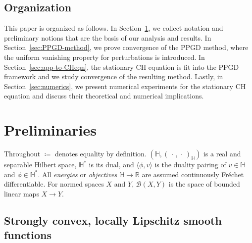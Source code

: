 \documentclass{amsart}
\newcommand{\calB}{{\mathcal{B}}}
\newcommand{\LL}{\mathcal{L}}
\newcommand{\pairing}[2]{\bigl\langle #1 , #2 \bigr\rangle}
\newcommand{\HH}{\mathbb{H}}
\newcommand{\RR}{\mathbb{R}}
\theoremstyle{definition}
\begin{document}
	\subsection{Organization}
This paper is organized as follows. In Section~\ref{sec:prelim}, we collect notation and preliminary notions that are the basis of our analysis and results. In Section~\ref{sec:PPGD-method}, we prove convergence of the PPGD method, where the uniform vanishing property for perturbations is introduced. In Section~\ref{sec:app-to-CHeqn}, the stationary CH equation is fit into the PPGD framework and we study convergence of the resulting method. Lastly, in Section~\ref{sec:numerics}, we present numerical experiments for the stationary CH equation and discuss their theoretical and numerical implications. 



	\section{Preliminaries}
	\label{sec:prelim}

Throughout $\coloneqq$ denotes equality by definition. $(\HH, (\, \cdot\, ,\, \cdot\, )_\HH)$ is a real and separable Hilbert space, $\HH^*$ is its dual, and $\pairing{\phi}{v}$ is the duality pairing of $v\in\HH$ and $\phi\in\HH^*$.  All \emph{energies} or \emph{objectives} $\HH \to \RR$ are assumed continuously Fr\'echet differentiable. For normed spaces $X$ and $Y$, $\calB(X,Y)$ is the space of bounded linear maps $X \to Y$.



\subsection{Strongly convex, locally Lipschitz smooth functions}\label{sub:prelim-Lip-conv}

\end{document}
